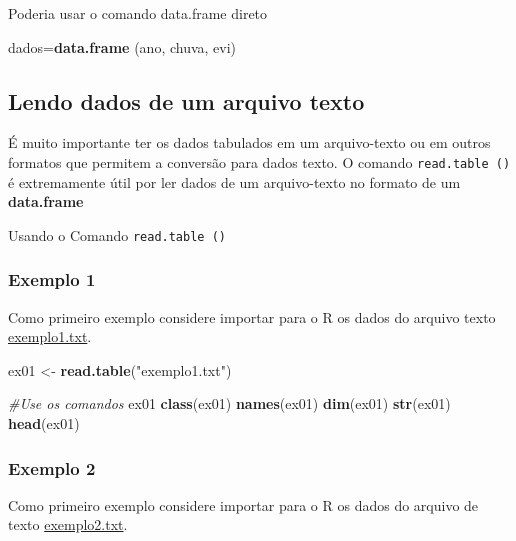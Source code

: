 \documentclass[
]{book}
\newenvironment{Shaded}{\begin{snugshade}}{\end{snugshade}}
\newcommand{\CommentTok}[1]{\textcolor[rgb]{0.56,0.35,0.01}{\textit{#1}}}
\newcommand{\KeywordTok}[1]{\textcolor[rgb]{0.13,0.29,0.53}{\textbf{#1}}}
\newcommand{\NormalTok}[1]{#1}
\newcommand{\StringTok}[1]{\textcolor[rgb]{0.31,0.60,0.02}{#1}}
\begin{document}
Poderia usar o comando data.frame direto

\begin{Shaded}
\begin{Highlighting}[]
\NormalTok{dados=}\KeywordTok{data.frame}\NormalTok{ (ano, chuva, evi)}
\end{Highlighting}
\end{Shaded}

\hypertarget{lendo-dados-de-um-arquivo-texto}{%
\subsection{Lendo dados de um arquivo texto}\label{lendo-dados-de-um-arquivo-texto}}

É muito importante ter os dados tabulados em um arquivo-texto ou em outros formatos que permitem a conversão para dados texto. O comando \texttt{read.table\ ()} é extremamente útil por ler dados de um arquivo-texto no formato de um \textbf{data.frame}

Usando o Comando \texttt{read.table\ ()}

\hypertarget{exemplo-1-1}{%
\subsubsection{Exemplo 1}\label{exemplo-1-1}}

Como primeiro exemplo considere importar para o R os dados do arquivo texto \href{https://www.dropbox.com/s/m7jivbbggei5y0x/exemplo1.txt?dl=1}{exemplo1.txt}.

\begin{Shaded}
\begin{Highlighting}[]
\NormalTok{ex01 <-}\StringTok{ }\KeywordTok{read.table}\NormalTok{(}\StringTok{"exemplo1.txt"}\NormalTok{) }

\CommentTok{#Use os comandos}
\NormalTok{  ex01}
  \KeywordTok{class}\NormalTok{(ex01)}
  \KeywordTok{names}\NormalTok{(ex01)}
  \KeywordTok{dim}\NormalTok{(ex01)}
  \KeywordTok{str}\NormalTok{(ex01)}
  \KeywordTok{head}\NormalTok{(ex01)}
\end{Highlighting}
\end{Shaded}

\hypertarget{exemplo-2-1}{%
\subsubsection{Exemplo 2}\label{exemplo-2-1}}

Como primeiro exemplo considere importar para o R os dados do arquivo de texto \href{https://www.dropbox.com/s/bi4b0j2nnnetc1r/exemplo2.txt?dl=1}{exemplo2.txt}.
\end{document}

